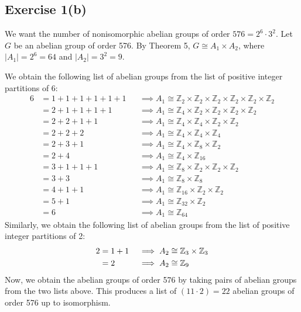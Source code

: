 \subsection*{Exercise 1(b)}
We want the number of nonisomorphic abelian groups of order $576 = 2^6\cdot3^2$. Let $G$ be an abelian group of order 576. By Theorem 5, $G \cong A_1 \times A_2$, where $|A_1| = 2^6 = 64$ and $|A_2| = 3^2 = 9$. 

We obtain the following list of abelian groups from the list of positive integer partitions of 6:
\begin{align}
    6 &= 1+1+1+1+1+1 &&\implies A_1 \cong \mathbb{Z}_2 \times \mathbb{Z}_2 \times \mathbb{Z}_2 \times \mathbb{Z}_2 \times \mathbb{Z}_2 \times \mathbb{Z}_2 \\
    &= 2+1+1+1+1 &&\implies A_1 \cong \mathbb{Z}_4 \times \mathbb{Z}_2 \times \mathbb{Z}_2 \times \mathbb{Z}_2 \times \mathbb{Z}_2 \\
    &= 2+2+1+1 &&\implies A_1 \cong \mathbb{Z}_4 \times \mathbb{Z}_4 \times \mathbb{Z}_2 \times \mathbb{Z}_2 \\
    &= 2+2+2 &&\implies A_1 \cong \mathbb{Z}_4 \times \mathbb{Z}_4 \times \mathbb{Z}_4 \\
    &= 2+3+1 &&\implies A_1 \cong \mathbb{Z}_4 \times \mathbb{Z}_8 \times \mathbb{Z}_2 \\
    &= 2+4 &&\implies A_1 \cong \mathbb{Z}_4 \times \mathbb{Z}_{16} \\
    &= 3+1+1+1 &&\implies A_1 \cong \mathbb{Z}_8 \times \mathbb{Z}_2 \times \mathbb{Z}_2 \times \mathbb{Z}_2 \\
    &= 3+3 &&\implies A_1 \cong \mathbb{Z}_8 \times \mathbb{Z}_8 \\
    &= 4+1+1 &&\implies A_1 \cong \mathbb{Z}_{16} \times \mathbb{Z}_2 \times \mathbb{Z}_2 \\
    &= 5+1 &&\implies A_1 \cong \mathbb{Z}_{32} \times \mathbb{Z}_2 \\
    &= 6 &&\implies A_1 \cong \mathbb{Z}_{64}
\end{align}
Similarly, we obtain the following list of abelian groups from the list of positive integer partitions of 2:
\begin{align}
    \setcounter{equation}{0}
    2 &= 1+1 &&\implies A_2 \cong \mathbb{Z}_3 \times \mathbb{Z}_3 \\
    &= 2 &&\implies A_2 \cong \mathbb{Z}_9
\end{align}
Now, we obtain the abelian groups of order 576 by taking pairs of abelian groups from the two lists above. This produces a list of $(11\cdot2) = 22$ abelian groups of order 576 up to isomorphism.